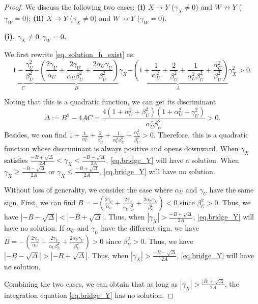 \documentclass[
  12pt]{article}
\def\to{\rightarrow}
\begin{document}
\begin{proof}
We discuss the following two cases: \textbf{(i)} $X \to Y$ ($\gamma_X \neq 0$) and $W \not\to Y$ ($\gamma_W = 0$); \textbf{(ii)} $X \to Y$ ($\gamma_X \neq 0$) and $W \not\to Y$ ($\gamma_W = 0$).

\textbf{(i). $\gamma_X\ne0,\gamma_W=0$.}

We first rewrite \eqref{eq. solution_h_exist} as:
$$
\underset{C}{\underbrace{1-\frac{\gamma_{U}^{2}}{\beta_{U}^{2}}}}\underset{B}{\underbrace{-\left( \frac{2\gamma_U}{\alpha_U}+\frac{2\gamma_U}{\alpha_U\beta_{U}^{2}}+\frac{2\alpha_U\gamma_U}{\beta_{U}^{2}} \right) }}\gamma_X\underset{A}{\underbrace{-\left( 1+\frac{1}{\alpha_{U}^{2}}+\frac{2}{\beta_{U}^{2}}+\frac{1}{\alpha_{U}^{2}\beta_{U}^{2}}+\frac{\alpha_{U}^{2}}{\beta_{U}^{2}} \right) }}\gamma_{X}^{2}>0.
$$

Noting that this is a quadratic function, we can get its discriminant 
$$
\Delta:=B^2-4AC=\frac{4\left( 1+\alpha_{U}^{2}+\beta_{U}^{2} \right) \left( 1+\alpha_{U}^{2}+\gamma_{U}^{2} \right)}{\alpha_{U}^{2}\beta_{U}^{2}}>0.
$$
Besides, we can find $ 1+\frac{1}{\alpha_{U}^{2}}+\frac{2}{\beta_{U}^{2}}+\frac{1}{\alpha_{U}^{2}\beta_{U}^{2}}+\frac{\alpha_{U}^{2}}{\beta_{U}^{2}}>0$. Therefore, this is a quadratic function whose discriminant is always positive and opens downward. When $\gamma_X$ satisfies $\frac{-B+\sqrt{\Delta}}{2A}<\gamma_X<\frac{-B-\sqrt{\Delta}}{2A}$, \eqref{eq.bridge_Y} will have a solution. When $\gamma_X\geq\frac{-B-\sqrt{\Delta}}{2A}$ or $\gamma_X\leq\frac{-B+\sqrt{\Delta}}{2A}$, \eqref{eq.bridge_Y} will have no solution. 

Without loss of generality, we consider the case where $\alpha_U$ and $\gamma_U$ have the same sign. First, we can find $ B=-(\frac{2\gamma_U}{\alpha_U}+\frac{2\gamma_U}{\alpha_U\beta_{U}^{2}}+\frac{2\alpha_U\gamma_U}{\beta_{U}^{2}})<0$ since $\beta_U^2>0$. Thus, we have $|-B-\sqrt{\Delta}|<|-B+\sqrt{\Delta}|$. Thus, when $|\gamma_X|>\frac{-B+\sqrt{\Delta}}{2A}$,  \eqref{eq.bridge_Y} will have no solution. If $\alpha_U$ and $\gamma_U$ have the different sign, we have $ B=-(\frac{2\gamma_U}{\alpha_U}+\frac{2\gamma_U}{\alpha_U\beta_{U}^{2}}+\frac{2\alpha_U\gamma_U}{\beta_{U}^{2}})>0$ since $\beta_U^2>0$. Thus, we have $|-B-\sqrt{\Delta}|>|-B+\sqrt{\Delta}|$. Thus, when $|\gamma_X|>\frac{-B-\sqrt{\Delta}}{2A}$,  \eqref{eq.bridge_Y} will have no solution.  

Combining the two cases, we can obtain that as long as $|\gamma_X|>\frac{|B|+\sqrt{\Delta}}{2A}$, the integration equation \eqref{eq.bridge_Y} has no solution.


\end{proof}
\end{document}
